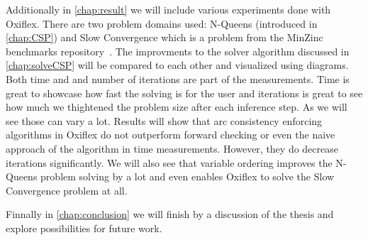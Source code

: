 Additionally in \cref{chap:result} we will include various experiments done with Oxiflex. There are two problem domains used: N-Queens (introduced in \cref{chap:CSP}) and Slow Convergence which is a problem from the MinZinc benchmarks repository~\cite{minizinc_slow:2018}. The improvments to the solver algorithm discussed in \cref{chap:solveCSP} will be compared to each other and visualized using diagrams. Both time and and number of iterations are part of the measurements. Time is great to showcase how fast the solving is for the user and iterations is great to see how much we thightened the problem size after each inference step. As we will see those can vary a lot. Results will show that arc consistency enforcing algorithms in Oxiflex do not outperform forward checking or even the naive approach of the algorithm in time measurements. However, they do decrease iterations significantly. We will also see that variable ordering improves the N-Queens problem solving by a lot and even enables Oxiflex to solve the Slow Convergence problem at all.

Finnally in \cref{chap:conclusion} we will finish by a discussion of the thesis and explore possibilities for future work.

